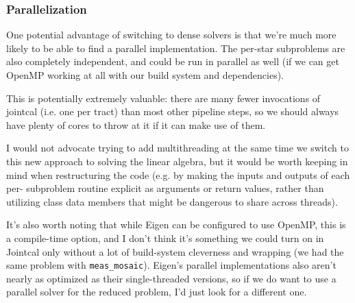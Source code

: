 \subsubsection{Parallelization}

One potential advantage of switching to dense solvers is that we're much more likely to be able to find a parallel implementation.
The per-star subproblems are also completely independent, and could be run in parallel as well (if we can get OpenMP working at all with our build system and dependencies).

This is potentially extremely valuable: there are many fewer invocations of jointcal (i.e. one per tract) than most other pipeline steps, so we should always have plenty of cores to throw at it if it can make use of them.

I would not advocate trying to add multithreading at the same time we switch to this new approach to solving the linear algebra, but it would be worth keeping in mind when restructuring the code (e.g. by making the inputs and outputs of each per- subproblem routine explicit as arguments or return values, rather than utilizing class data members that might be dangerous to share across threads).

It's also worth noting that while Eigen can be configured to use OpenMP, this is a compile-time option, and I don't think it's something we could turn on in Jointcal only without a lot of build-system cleverness and wrapping (we had the same problem with \texttt{meas\_mosaic}).
Eigen's parallel implementations also aren't nearly as optimized as their single-threaded versions, so if we do want to use a parallel solver for the reduced problem, I'd just look for a different one.
